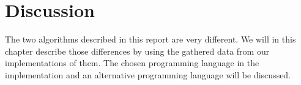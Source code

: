 \chapter{Discussion}
\emptyTop{}
The two algorithms described in this report are very different. 
We will in this chapter describe those differences by using the gathered data from our implementations of them.
The chosen programming language in the implementation and an alternative programming language will be discussed.





